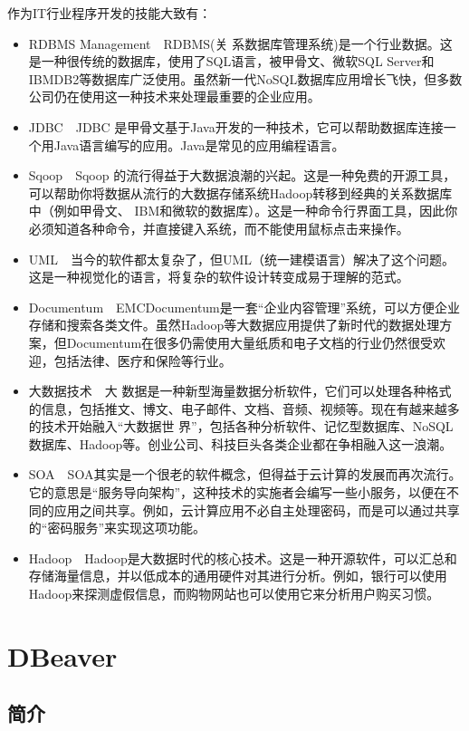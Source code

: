 \documentclass[paper=a4,fontsize=11pt]{article}
\begin{document}
	作为IT行业程序开发的技能大致有：
	\begin{itemize}
		\item{RDBMS Management}~~RDBMS(关 系数据库管理系统)是一个行业数据。这是一种很传统的数据库，使用了SQL语言，被甲骨文、微软SQL Server和IBMDB2等数据库广泛使用。虽然新一代NoSQL数据库应用增长飞快，但多数公司仍在使用这一种技术来处理最重要的企业应用。
		\item{JDBC}~~JDBC 是甲骨文基于Java开发的一种技术，它可以帮助数据库连接一个用Java语言编写的应用。Java是常见的应用编程语言。
		\item{Sqoop}~~Sqoop 的流行得益于大数据浪潮的兴起。这是一种免费的开源工具，可以帮助你将数据从流行的大数据存储系统Hadoop转移到经典的关系数据库中（例如甲骨文、 IBM和微软的数据库）。这是一种命令行界面工具，因此你必须知道各种命令，并直接键入系统，而不能使用鼠标点击来操作。
		\item{UML}~~当今的软件都太复杂了，但UML（统一建模语言）解决了这个问题。这是一种视觉化的语言，将复杂的软件设计转变成易于理解的范式。
		\item{Documentum}~~EMCDocumentum是一套“企业内容管理”系统，可以方便企业存储和搜索各类文件。虽然Hadoop等大数据应用提供了新时代的数据处理方案，但Documentum在很多仍需使用大量纸质和电子文档的行业仍然很受欢迎，包括法律、医疗和保险等行业。
		\item{大数据技术}~~大 数据是一种新型海量数据分析软件，它们可以处理各种格式的信息，包括推文、博文、电子邮件、文档、音频、视频等。现在有越来越多的技术开始融入“大数据世 界”，包括各种分析软件、记忆型数据库、NoSQL数据库、Hadoop等。创业公司、科技巨头各类企业都在争相融入这一浪潮。
		\item{SOA}~~SOA其实是一个很老的软件概念，但得益于云计算的发展而再次流行。它的意思是“服务导向架构”，这种技术的实施者会编写一些小服务，以便在不同的应用之间共享。例如，云计算应用不必自主处理密码，而是可以通过共享的“密码服务”来实现这项功能。
		\item{Hadoop}~~Hadoop是大数据时代的核心技术。这是一种开源软件，可以汇总和存储海量信息，并以低成本的通用硬件对其进行分析。例如，银行可以使用Hadoop来探测虚假信息，而购物网站也可以使用它来分析用户购买习惯。
	\end{itemize}
	
	
	\newpage
	
	\section{DBeaver}
	
	\subsection{简介}
	
\end{document}
